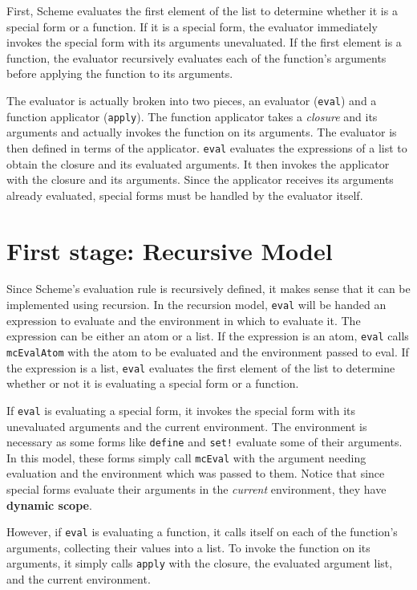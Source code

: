 	First, Scheme evaluates the first element of the list to
determine whether it is a special form or a function.  If it is a special
form, the evaluator immediately invokes the special form with its
arguments unevaluated.  If the first element is a function, the evaluator
recursively evaluates each of the function's arguments before applying
the function to its arguments.

	The evaluator is actually broken into two pieces, an evaluator
({\tt eval}) and a function applicator ({\tt apply}).  The function
applicator takes a {\em closure} and its arguments and actually invokes
the function on its arguments.  The evaluator is then defined in terms of
the applicator.  {\tt eval} evaluates the expressions of a list to obtain
the closure and its evaluated arguments.  It then invokes the applicator
with the closure and its arguments.  Since the applicator receives its
arguments already evaluated, special forms must be handled by the
evaluator itself.

\section{First stage: Recursive Model}

	Since Scheme's evaluation rule is recursively defined, it makes
sense that it can be implemented using recursion.  In the recursion model,
{\tt eval} will be handed an expression to evaluate and the environment in
which to evaluate it.  The expression can be either an atom or a list.  If
the expression is an atom, {\tt eval} calls {\tt mcEvalAtom} with the atom
to be evaluated and the environment passed to eval.  If the expression is
a list, {\tt eval} evaluates the first element of the list to determine
whether or not it is evaluating a special form or a function.

	If {\tt eval} is evaluating a special form, it invokes the special
form with its unevaluated arguments and the current environment.  The
environment is necessary as some forms like {\tt define} and {\tt set!}
evaluate some of their arguments.  In this model, these forms simply call
{\tt mcEval} with the argument needing evaluation and the environment
which was passed to them.  Notice that since special forms evaluate their
arguments in the {\em current} environment, they have {\bf dynamic scope}.

	However, if {\tt eval} is evaluating a function, it calls itself
on each of the function's arguments, collecting their values into a list.
To invoke the function on its arguments, it simply calls {\tt apply} with
the closure, the evaluated argument list, and the current environment.

